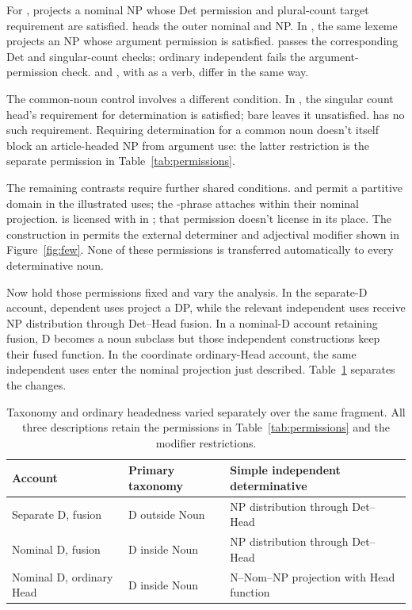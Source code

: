 \documentclass[12pt]{article}
\begin{document}
For ,  projects a nominal NP whose Det permission and plural-count target requirement are satisfied.  heads the outer nominal and NP. In , the same lexeme projects an NP whose argument permission is satisfied.  passes the corresponding Det and singular-count checks; ordinary independent  fails the argument-permission check.  and , with  as a verb, differ in the same way.

The common-noun control involves a different condition. In , the singular count head's requirement for determination is satisfied; bare  leaves it unsatisfied.  has no such requirement. Requiring determination for a common noun doesn't itself block an article-headed NP from argument use: the latter restriction is the separate permission in Table~\ref{tab:permissions}.

The remaining contrasts require further shared conditions.  and  permit a partitive domain in the illustrated uses; the -phrase attaches within their nominal projection.  is licensed with  in ; that permission doesn't license  in its place. The  construction in  permits the external determiner and adjectival modifier shown in Figure~\ref{fig:few}. None of these permissions is transferred automatically to every determinative noun.

Now hold those permissions fixed and vary the analysis. In the separate-D account, dependent uses project a DP, while the relevant independent uses receive NP distribution through Det--Head fusion. In a nominal-D account retaining fusion, D becomes a noun subclass but those independent constructions keep their fused function. In the coordinate ordinary-Head account, the same independent uses enter the nominal projection just described. Table~\ref{tab:economy} separates the changes.

\begin{table}[tb]
\centering\small
\caption{Taxonomy and ordinary headedness varied separately over the same fragment. All three descriptions retain the permissions in Table~\ref{tab:permissions} and the modifier restrictions.}\label{tab:economy}
\begin{tabular}{>{\raggedright\arraybackslash}p{3.1cm}>{\raggedright\arraybackslash}p{3.9cm}>{\raggedright\arraybackslash}p{4.7cm}}
\toprule
Account & Primary taxonomy & Simple independent determinative \\
\midrule
Separate D, fusion & D outside Noun & NP distribution through Det--Head \\
Nominal D, fusion & D inside Noun & NP distribution through Det--Head \\
Nominal D, ordinary Head & D inside Noun & N--Nom--NP projection with Head function \\
\bottomrule
\end{tabular}
\end{table}
\end{document}
